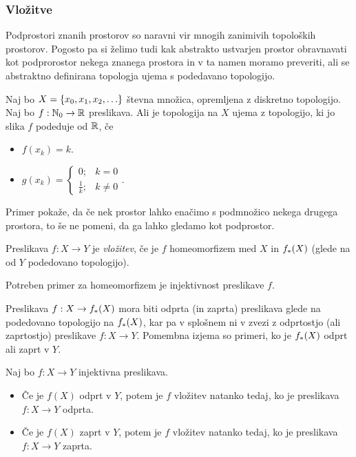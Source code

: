\subsubsection{Vložitve}
Podprostori znanih prostorov so naravni vir mnogih zanimivih topoloških prostorov. Pogosto pa si želimo tudi kak abstrakto ustvarjen prostor obravnavati kot podprorostor nekega znanega prostora in v ta namen moramo preveriti, ali se abstraktno definirana topologja ujema s podedavano topologijo.

\begin{primer}
    Naj bo $X = \left\{x_0, x_1, x_2, \ldots\right\}$ števna množica, opremljena z diskretno topologijo. Naj bo $f: \mathbb{N}_0 \to \mathbb{R}$ preslikava. Ali je topologija na $X$ ujema z topologijo, ki jo slika $f$ podeduje od $\mathbb{R}$, če
    \begin{itemize}
        \item $f(x_k) = k$.
        \item $g(x_k) = \begin{cases}
            0; &k = 0 \\ \frac{1}{k}; & k \neq 0
        \end{cases}.$
    \end{itemize}
\end{primer}

\begin{opomba}
    Primer pokaže, da če nek prostor lahko enačimo s podmnožico nekega drugega prostora, to še ne pomeni, da ga lahko gledamo kot podprostor.
\end{opomba}

\begin{definicija}
    Preslikava $f: X \to Y$ je \emph{vložitev}, če je $f$ homeomorfizem med $X$ in $f_{*}(X)$ (glede na od $Y$ podedovano topologijo).
\end{definicija}

\begin{opomba}
    Potreben primer za homeomorfizem je injektivnost preslikave $f$. 
\end{opomba}

Preslikava $f: X \to f_{*}(X)$ mora biti odprta (in zaprta) preslikava glede na podedovano topologijo na $f_{*}(X)$, kar pa v splošnem ni v zvezi z odprtostjo (ali zaprtostjo) preslikave $f: X \to Y$. Pomembna izjema so primeri, ko je $f_{*}(X)$ odprt ali zaprt v $Y$.

\begin{trditev}
    Naj bo $f: X \to Y$ injektivna preslikava.
    \begin{itemize}
        \item Če je $f(X)$ odprt v $Y$, potem je $f$ vložitev natanko tedaj, ko je preslikava $f: X \to Y$ odprta.
        \item Če je $f(X)$ zaprt v $Y$, potem je $f$ vložitev natanko tedaj, ko je preslikava $f: X \to Y$ zaprta.
    \end{itemize}
\end{trditev}

